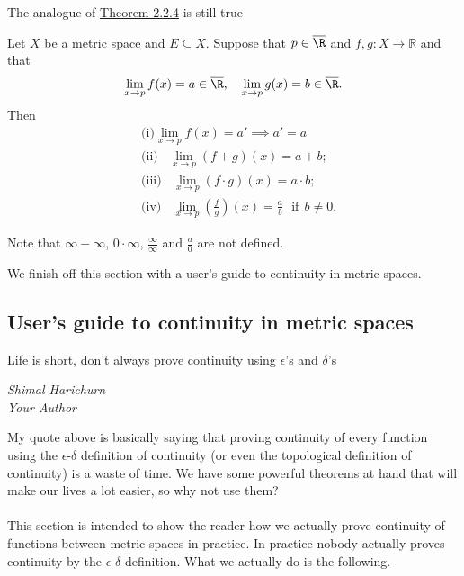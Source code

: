 	 
	 
	 The analogue of \hyperlink{limit-thm}{Theorem 2.2.4} is still true 
	 
	 \begin{theorem}
	 		Let $X$ be a metric space and $E \subseteq X$. Suppose that $p \in \overline{\R}$ and $f, g : X \to \mathbb{R}$ and that $$\lim_{x \to p} f(x) = a \in \overline{\R}, \ \ \ \lim_{x \to p} g(x) = b \in \overline{\R}.$$Then  	
	 		\begin{align*}
	 		&\text{(i)} \lim_{x \to p} f(x) = a' \implies a' = a\\
	 		&\text{(ii)} \ \  \ \ \lim_{x \to p}(f+g)(x) = a + b; \\
	 		&\text{(iii)} \ \  \ \ \lim_{x \to p}(f\cdot g)(x) = a \cdot b; \\
	 		&\text{(iv)} \ \  \ \ \lim_{x \to p}\left( \frac{f}{g}\right) (x) = \frac{a}{b} \ \ \ \text{if} \ \ b\neq 0.
	 		\end{align*}	 		
	 \end{theorem}
	 
	 \begin{point}
	 	Note that $\infty -\infty$, $0 \cdot \infty$, $\frac{\infty}{\infty}$ and $\frac{a}{0}$ are not defined.
	 \end{point}
	 
	 
	 We finish off this section with a user's guide to continuity in metric spaces.
	 
	 \newpage
	 \subsection{User's guide to continuity in metric spaces}
	 
	 \epigraph{Life is short, don't always prove continuity using $\epsilon$'s and $\delta$'s}{\textit{Shimal Harichurn \\ Your Author}}
	 
	 My quote above is basically saying that proving continuity of every function using the $\epsilon$-$\delta$ definition of continuity (or even the topological definition of continuity) is a waste of time. We have some powerful theorems at hand that will make our lives a lot easier, so why not use them?  \\ \\ This section is intended to show the reader how we actually prove continuity of functions between metric spaces in practice. In practice nobody actually proves continuity by the $\epsilon$-$\delta$ definition. What we actually do is the following.
	 
